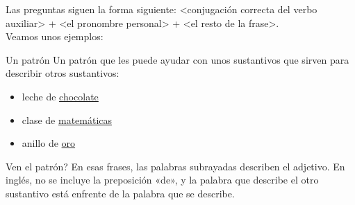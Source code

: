 Las preguntas siguen la forma siguiente: <conjugaci\'on correcta del verbo auxiliar> + <el pronombre personal> + <el resto de la frase>. \\

Veamos unos ejemplos:


\begin{conf}{Un patr\'on}
	Un patr\'on que les puede ayudar con unos sustantivos que sirven para describir otros sustantivos:
	\begin{itemize}
		\item leche de \underline{chocolate} \arr {}
		\item clase de \underline{matemáticas} \arr {}
		\item anillo de \underline{oro} \arr {}
	\end{itemize}

	\textquestiondown Ven el patr\'on?
	En esas frases, las palabras subrayadas describen el adjetivo.
	En ingl\'es, no se incluye la preposici\'on «de», y la palabra que describe el otro sustantivo está enfrente de
	la palabra que se describe.
\end{conf}
